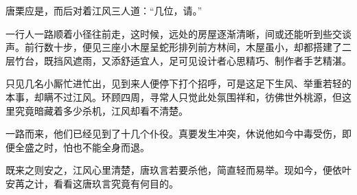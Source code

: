 唐栗应是，而后对着江风三人道：“几位，请。”

一行人一路顺着小径往前走，这时候，远处的房屋逐渐清晰，间或还能听到些交谈声。前行数十步，便见三座小木屋呈蛇形排列前方林间，木屋虽小，却都搭建了二层竹台，既挡风遮雨，又添舒适宜人，足可见设计者心思精巧、制作者手艺精湛。

只见几名小厮忙进忙出，见到来人便停下打个招呼，可是这足下生风、举重若轻的本事，却瞒不过江风。环顾四周，寻常人只觉此处氛围祥和，彷佛世外桃源，但这里究竟暗藏着多少杀机，江风却看不清楚。

一路而来，他们已经见到了十几个仆役。真要发生冲突，休说他如今中毒受伤，即便全盛之时，怕也不能全身而退。

既来之则安之，江风心里清楚，唐玖言若要杀他，简直轻而易举。现如今，便依叶安苒之计，看看这唐玖言究竟有何目的。